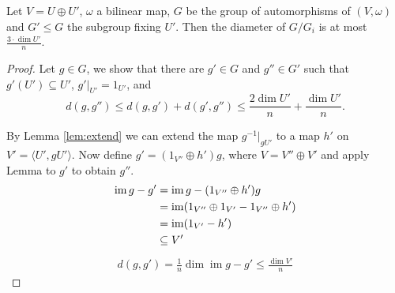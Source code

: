 \begin{lemma}
Let $V=U\oplus U'$, $\omega$ a bilinear map, $G$ be the group of automorphisms of $(V,\omega)$ and $G'\leq G$ the subgroup fixing $U'$. Then the diameter of $G/G_i$ is at most $\frac{3\cdot\dim U'}{n}$.
\end{lemma}
\begin{proof}
Let $g\in G$, we show that there are $g'\in G$ and $g''\in G'$ such that $g'(U')\subseteq U'$, $g'|_{U'}=1_{U'}$, and
\[d(g,g'')\leq d(g,g')+d(g',g'')\leq \frac{2\dim U'}{n}+\frac{\dim U'}{n}.\]

By Lemma \ref{lem:extend} we can extend the map $g^{-1}|_{gU'}$ to a map $h'$ on $V'=\langle U',gU' \rangle$. Now define $g'=(1_{V''}\oplus h')g$, where $V=V''\oplus V'$ and apply Lemma to $g'$ to obtain $g''$.
\begin{align*}
\operatorname{im} g-g'&= \operatorname{im} g-(1_{V''}\oplus h')g\\
&=\operatorname{im} (1_{V''}\oplus 1_{V'}-1_{V''}\oplus h')\\
&=\operatorname{im} (1_{V'}-h')\\
&\subseteq V'	
\end{align*}
\begin{align*}
d(g,g')=\frac{1}{n}\dim \operatorname{im} g-g'\leq \frac{\dim V'}{n}
\end{align*}
\end{proof}
